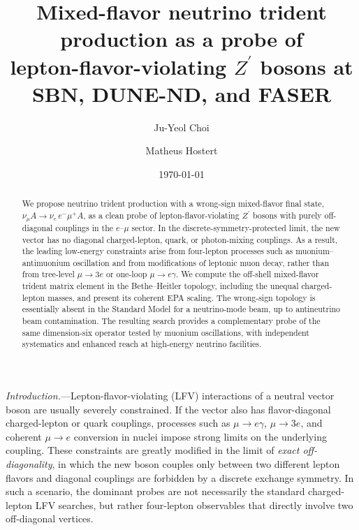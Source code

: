 \documentclass[
  aps,
  prl,
  twocolumn,
  superscriptaddress,
  amsmath, amssymb,
  floatfix, nofootinbib,
  longbibliography,
]{revtex4-2}
\newcommand{\numu}{\nu_\mu}
\newcommand{\nue}{\nu_e}
\newcommand{\Zp}{Z^{\prime}}
\begin{document}
\title{Mixed-flavor neutrino trident production as a probe of\\
lepton-flavor-violating $\Zp$ bosons at SBN, DUNE-ND, and FASER}

\author{Ju-Yeol Choi}

\author{Matheus Hostert}

\date{\today}

\begin{abstract}
We propose neutrino trident production with a wrong-sign mixed-flavor
final state, $\numu A \to \nue\, e^- \mu^+ A$, as a clean probe of
lepton-flavor-violating $\Zp$ bosons with purely off-diagonal couplings
in the $e$--$\mu$ sector.  In the discrete-symmetry-protected limit,
the new vector has no diagonal charged-lepton, quark, or photon-mixing
couplings.  As a result, the leading low-energy constraints arise from
four-lepton processes such as muonium--antimuonium oscillation and from
modifications of leptonic muon decay, rather than from tree-level
$\mu\to 3e$ or one-loop $\mu\to e\gamma$.  We compute the off-shell
mixed-flavor trident matrix element in the Bethe--Heitler topology,
including the unequal charged-lepton masses, and present its coherent
EPA scaling.  The wrong-sign topology is essentially absent in the
Standard Model for a neutrino-mode beam, up to antineutrino beam
contamination.  The resulting search provides a complementary probe of
the same dimension-six operator tested by muonium oscillations, with
independent systematics and enhanced reach at high-energy neutrino
facilities.
\end{abstract}

\maketitle

\textit{Introduction.}---Lepton-flavor-violating (LFV) interactions of
a neutral vector boson are usually severely constrained.  If the vector
also has flavor-diagonal charged-lepton or quark couplings, processes
such as $\mu\to e\gamma$, $\mu\to 3e$, and coherent $\mu\to e$
conversion in nuclei impose strong limits on the underlying coupling.
These constraints are greatly modified in the limit of \emph{exact
off-diagonality}, in which the new boson couples only between two
different lepton flavors and diagonal couplings are forbidden by a
discrete exchange symmetry.  In such a scenario, the dominant probes
are not necessarily the standard charged-lepton LFV searches, but rather
four-lepton observables that directly involve two off-diagonal vertices.
\end{document}
